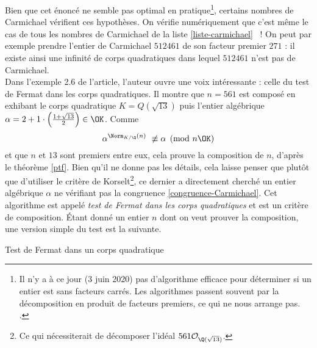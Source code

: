 Bien que cet énoncé ne semble pas optimal en pratique\footnote{Il n'y a à ce jour (3 juin 2020) pas d'algorithme efficace pour déterminer si un entier est sans facteurs carrés. Les algorithmes passent souvent par la décomposition en produit de facteurs premiers, ce qui ne nous arrange pas. .}, certains nombres de Carmichael vérifient ces hypothèses. On vérifie numériquement que c'est même le cas de tous les nombres de Carmichael de la liste \ref{liste-carmichael} ~! On peut par exemple prendre l'entier de Carmichael $512461$ de son facteur premier $271$ : il existe ainsi une infinité de corps quadratiques dans lequel $512461$ n'est pas de Carmichael. \\

Dans l'exemple 2.6 de l'article, l'auteur ouvre une voix intéressante : celle du test de Fermat dans les corps quadratiques. Il montre que $n = 561$ est composé en exhibant le corps quadratique $K = Q(\sqrt{13})$ puis l'entier algébrique $\alpha = 2 + 1\cdot \left(\frac{1 + \sqrt{13}}{2}\right) \in \OK$. Comme $$\alpha^{\Norm_{K/\Q}(n)} \not \equiv \alpha \pmod{n\OK}$$ et que $n$ et $13$ sont premiers entre eux, cela prouve la composition de $n$, d'après le théorème \ref{ptf}. Bien qu'il ne donne pas les détails, cela laisse penser que plutôt que d'utiliser le critère de Korselt\footnote{Ce qui nécessiterait de décomposer l'idéal $561\mathcal{O}_{\Q(\sqrt{13})}$.}, ce dernier a directement cherché un entier algébrique $\alpha$ ne vérifiant pas la congruence \ref{congruence-Carmichael}. Cet algorithme est appelé \emph{test de Fermat dans les corps quadratiques} et est un critère de composition. Étant donné un entier $n$ dont on veut prouver la composition, une version simple du test est la suivante.

\vspace{1em}
\begin{algorithm}[H]\label{test-Fermat-quadratique}
\caption{Test de Fermat dans un corps quadratique}
\end{algorithm}
\vspace{1em}

